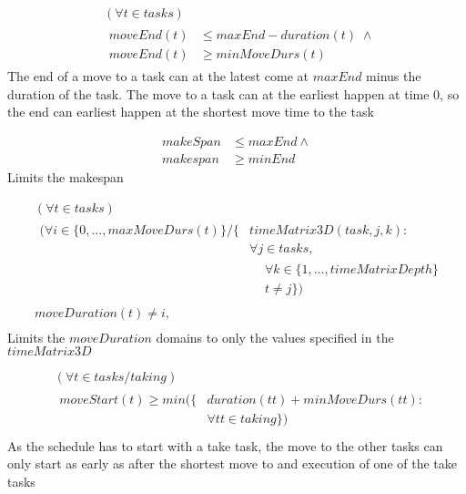 \documentclass[10pt,a4paper]{report}
\begin{document}
\begin{equation}
\begin{aligned}\label{eq:65}
&(\forall t \in tasks)\\
&\begin{aligned}
moveEnd(t) &\le maxEnd - duration(t) \; \land\\
moveEnd(t) &\ge minMoveDurs(t)
\end{aligned}
\end{aligned}
\end{equation}
The end of a move to a task can at the latest come at $maxEnd$ minus the duration of the task. The move to a task can at the earliest happen at time 0, so the end can earliest happen at the shortest move time to the task

\begin{equation}\label{eq:66}
\begin{aligned}
makeSpan &\le maxEnd \land\\
makespan &\ge minEnd
\end{aligned}
\end{equation}
Limits the makespan

\begin{equation}
\begin{aligned}\label{eq:67}
&(\forall t \in tasks)\\
&\begin{aligned}
(\forall i \in \{0 , \ldots , maxMoveDurs(t)\} / \{&timeMatrix3D(task,j,k) :\\
&\forall j \in tasks,\\
&\begin{aligned}
&\forall k \in \{1 , \ldots , timeMatrixDepth\}\\
&t \neq j\})
\end{aligned}
\end{aligned}\\
&moveDuration(t) \neq i, \\
\end{aligned}
\end{equation}
Limits the $moveDuration$ domains to only the values specified in the $timeMatrix3D$

\begin{equation}
\begin{aligned}\label{eq:69}
&(\forall t \in tasks / taking) \\
&\begin{aligned}
moveStart(t) \ge min(\{&duration(tt) + minMoveDurs(tt) :\\
&\forall tt \in taking\})\\
\end{aligned}
\end{aligned}
\end{equation}
As the schedule has to start with a take task, the move to the other tasks can only start as early as after the shortest move to and execution of one of the take tasks
\end{document}
